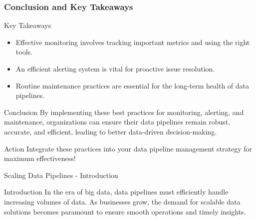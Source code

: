 \documentclass[aspectratio=169]{beamer}
\begin{document}
\begin{frame}[fragile]
    \frametitle{Conclusion and Key Takeaways}
    \begin{block}{Key Takeaways}
        \begin{itemize}
            \item Effective monitoring involves tracking important metrics and using the right tools.
            \item An efficient alerting system is vital for proactive issue resolution.
            \item Routine maintenance practices are essential for the long-term health of data pipelines.
        \end{itemize}
    \end{block}
    
    \begin{block}{Conclusion}
        By implementing these best practices for monitoring, alerting, and maintenance, organizations can ensure their data pipelines remain robust, accurate, and efficient, leading to better data-driven decision-making.
    \end{block}
    
    \begin{block}{Action}
        Integrate these practices into your data pipeline management strategy for maximum effectiveness!
    \end{block}
\end{frame}

\begin{frame}[fragile]{Scaling Data Pipelines - Introduction}
    \begin{block}{Introduction}
        In the era of big data, data pipelines must efficiently handle increasing volumes of data. As businesses grow, the demand for scalable data solutions becomes paramount to ensure smooth operations and timely insights.
    \end{block}
\end{frame}
\end{document}
